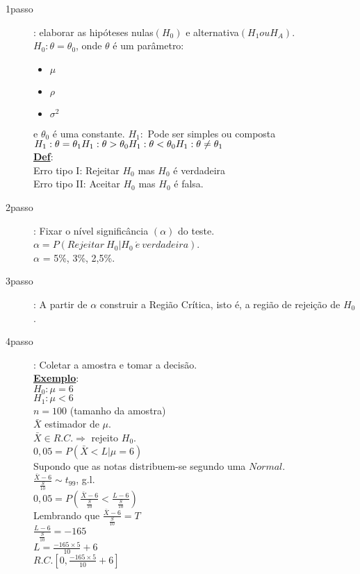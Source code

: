 \documentclass[12pt, oneside]{article}
\begin{document}
\begin{description}
\item[1\textordmasculine passo]: elaborar as hipóteses nulas$(H_0)$ e alternativa$(H_1 ou H_A)$.\\
$H_0: \theta = \theta_0$, onde $\theta$ é um parâmetro:
\begin{itemize}
\item $\mu$
\item $\rho$
\item $\sigma^2$
\end{itemize}
e $\theta_0$ é uma constante.
$H_1:$ Pode ser simples ou composta\\
$H_1:\theta=\theta_1\\ H_1:\theta>\theta_0\\ H_1:\theta<\theta_0\\ H_1:\theta\neq\theta_1$\\
\newpage
\noindent\textbf{\underline{Def}}:\\Erro tipo I: Rejeitar $H_0$ mas $H_0$ é verdadeira\\
Erro tipo II: Aceitar $H_0$ mas $H_0$ é falsa.
\item[2\textordmasculine passo]: Fixar o nível significância $(\alpha)$ do teste.\\
$\alpha = P(Rejeitar\: H_0|H_0\: \acute{e}\: verdadeira)$.\\
$\alpha$ = 5\%, 3\%, 2,5\%.
\item[3\textordmasculine passo]: A partir de $\alpha$ construir a Região Crítica, isto é, a região de rejeição de $H_0$.
\item[4\textordmasculine passo]: Coletar a amostra e tomar a decisão.\\
\textbf{\underline{Exemplo}}:\\
$H_0: \mu = 6$\\
$H_1: \mu < 6$\\
$n=100$ (tamanho da amostra)\\
$\bar{X}$ estimador de $\mu$.\\
$\bar{X}\in R.C. \Rightarrow$ rejeito $H_0$.\\
$0,05 = P(\bar{X}<L|\mu = 6)$\\
Supondo que as notas distribuem-se segundo uma $Normal$.\\
$\frac{\bar{X}-6}{\frac{S}{10}}\sim t_{99}$, g.l.\\
$0,05=P(\frac{\bar{X}-6}{\frac{S}{10}}<\frac{L-6}{\frac{S}{10}})$\\
Lembrando que $\frac{\bar{X}-6}{\frac{S}{10}} = T$\\
$\frac{L-6}{\frac{S}{10}}=-165$\\
$L=\frac{-165\times 5}{10}+6$\\
$R.C. [0,\frac{-165\times 5}{10}+6]$
\end{description}
\end{document}
